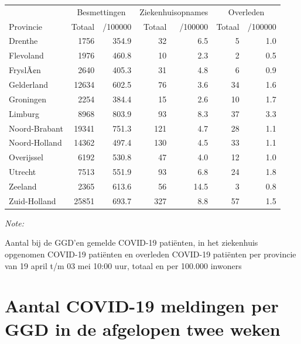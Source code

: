 \documentclass[
  english,
  man,floatsintext]{apa6}
\begin{document}
\begin{table}
\centering
\begin{threeparttable}
\begin{tabular}{lrrrrrr}
\toprule
\multicolumn{1}{c}{ } & \multicolumn{2}{c}{Besmettingen} & \multicolumn{2}{c}{Ziekenhuisopnames} & \multicolumn{2}{c}{Overleden} \\
\cmidrule(l{3pt}r{3pt}){2-3} \cmidrule(l{3pt}r{3pt}){4-5} \cmidrule(l{3pt}r{3pt}){6-7}
Provincie & Totaal & /100000 & Totaal & /100000 & Totaal & /100000\\
\midrule
Drenthe & 1756 & 354.9 & 32 & 6.5 & 5 & 1.0\\
Flevoland & 1976 & 460.8 & 10 & 2.3 & 2 & 0.5\\
FryslÃ¢n & 2640 & 405.3 & 31 & 4.8 & 6 & 0.9\\
Gelderland & 12634 & 602.5 & 76 & 3.6 & 34 & 1.6\\
Groningen & 2254 & 384.4 & 15 & 2.6 & 10 & 1.7\\
Limburg & 8968 & 803.9 & 93 & 8.3 & 37 & 3.3\\
Noord-Brabant & 19341 & 751.3 & 121 & 4.7 & 28 & 1.1\\
Noord-Holland & 14362 & 497.4 & 130 & 4.5 & 33 & 1.1\\
Overijssel & 6192 & 530.8 & 47 & 4.0 & 12 & 1.0\\
Utrecht & 7513 & 551.9 & 93 & 6.8 & 24 & 1.8\\
Zeeland & 2365 & 613.6 & 56 & 14.5 & 3 & 0.8\\
Zuid-Holland & 25851 & 693.7 & 327 & 8.8 & 57 & 1.5\\
\bottomrule
\end{tabular}
\begin{tablenotes}
\item \textit{Note: } 
\item Aantal bij de GGD’en gemelde COVID-19 patiënten, in het ziekenhuis opgenomen COVID-19 patiënten en overleden COVID-19 patiënten per provincie van 19 april t/m 03 mei 10:00 uur, totaal en per 100.000 inwoners
\end{tablenotes}
\end{threeparttable}
\end{table}

\newpage

\hypertarget{aantal-covid-19-meldingen-per-ggd-in-de-afgelopen-twee-weken}{%
\section{Aantal COVID-19 meldingen per GGD in de afgelopen twee weken}\label{aantal-covid-19-meldingen-per-ggd-in-de-afgelopen-twee-weken}}
\end{document}
